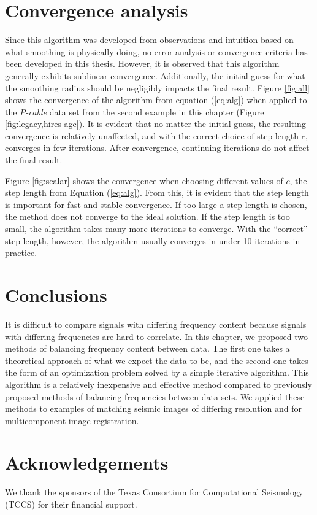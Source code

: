 \section{Convergence analysis}
        Since this algorithm was developed from observations and intuition based on what smoothing is physically doing, no error analysis or convergence criteria has been developed in this thesis.
        However, it is observed that this algorithm generally exhibits sublinear convergence.
        Additionally, the initial guess for what the smoothing radius should be negligibly impacts the final result.
        Figure \ref{fig:all} shows the convergence of the algorithm from equation (\ref{eq:alg}) when applied to the {\em P-cable} data set from the second example in this chapter (Figure \ref{fig:legacy,hires-agc}).
        It is evident that no matter the initial guess, the resulting convergence is relatively unaffected, and with the correct choice of step length $c$, converges in few iterations.
        After convergence, continuing iterations do not affect the final result.

        Figure \ref{fig:scalar} shows the convergence when choosing different values of $c$, the step length from Equation (\ref{eq:alg}).
        From this, it is evident that the step length is important for fast and stable convergence. 
        If too large a step length is chosen, the method does not converge to the ideal solution.
        If the step length is too small, the algorithm takes many more iterations to converge.
        With the ``correct'' step length, however, the algorithm usually converges in under 10 iterations in practice.


\section{Conclusions}
        It is difficult to compare signals with differing frequency content because signals with
        differing frequencies are hard to correlate. In this chapter, we proposed two methods of
        balancing frequency content between data. 
        The first one takes a theoretical approach of what we expect the data to be, and the second one takes the form of an optimization problem
        solved by a simple iterative algorithm. This algorithm is a relatively inexpensive and effective method
        compared to previously proposed methods of balancing frequencies between data sets. We
        applied these methods to examples of matching seismic images of differing resolution and for
        multicomponent image registration.


\section{Acknowledgements}
        We thank the sponsors of the Texas Consortium for Computational Seismology (TCCS) for their
        financial support.
%
%
%
%
